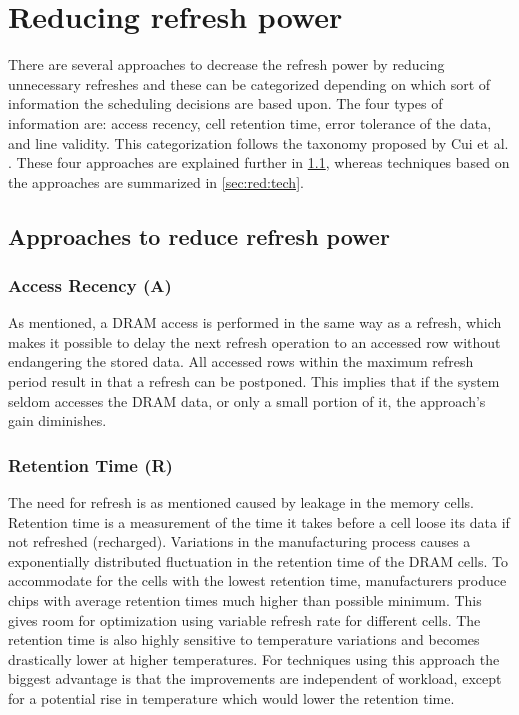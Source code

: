 \section{Reducing refresh power} 
\label{sec:red}
There are several approaches to decrease the refresh power by reducing unnecessary refreshes and these can be categorized depending on which sort of information the scheduling decisions are based upon. The four types of information are: access recency, cell retention time, error tolerance of the data, and line validity. This categorization follows the taxonomy proposed by Cui et al. \cite{dtail}. These four approaches are explained further in \ref{sec:red:app}, whereas techniques based on the approaches are summarized in \ref{sec:red:tech}. 

\subsection{Approaches to reduce refresh power}
\label{sec:red:app}

\subsubsection*{\textbf{Access Recency (A)}}
As mentioned, a DRAM access is performed in the same way as a refresh, which makes it possible to delay the next refresh operation to an accessed row without endangering the stored data. All accessed rows within the maximum refresh period result in that a refresh can be postponed. This implies that if the system seldom accesses the DRAM data, or only a small portion of it, the approach's gain diminishes.


\subsubsection*{\textbf{Retention Time (R)}}
The need for refresh is as mentioned caused by leakage in the memory cells. Retention time is a measurement of the time it takes before a cell loose its data if not refreshed (recharged). Variations in the manufacturing process causes a exponentially distributed fluctuation \cite{katayama} in the retention time of the DRAM cells. To accommodate for the cells with the lowest retention time, manufacturers produce chips with average retention times much higher than possible minimum. This gives room for optimization using variable refresh rate for different cells. The retention time is also highly sensitive to temperature variations and becomes drastically lower at higher temperatures. For techniques using this approach the biggest advantage is that the improvements are independent of workload, except for a potential rise in temperature which would lower the retention time.

